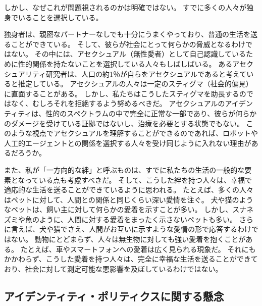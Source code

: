 \documentclass[paper=a4,book,openany]{jlreq}
\begin{document}
しかし、なぜこれが問題視されるのかは明確ではない。
すでに多くの人々が独身でいることを選択している\citep{depaulo17:_how_many_americ_want_be_singl}。

独身者は、親密なパートナーなしでも十分にうまくやっており、普通の生活を送ることができている。
そして、彼らが社会にとって何らかの脅威となるわけではない。
その中には、アセクシュアル（無性愛者）として自己認識しているために性的関係を持たないことを選択している人々もしばしばいる。
あるアセクシュアリティ研究者は、人口の約1％が自らをアセクシュアルであると考えていると推定している\citep{bogaert04:_asexual}。
アセクシュアルの人々は一定のスティグマ（社会的偏見）に直面することがある。
しかし、私たちはこうしたスティグマを助長するのではなく、むしろそれを拒絶するよう努めるべきだ。
アセクシュアルのアイデンティティは、性的のスペクトラムの中で完全に正常な一部であり、彼らが何らかのダメージを受けている証拠ではないし、治療を必要とする状態でもない。
このような視点でアセクシュアルを理解することができるのであれば、ロボットや人工的エージェントとの関係を選択する人々を受け同じように入れない理由があるだろうか。

また、私が「一方向的な絆」と呼ぶものは、すでに私たちの生活の一般的な要素となっている点も考慮すべきだ。
そして、こうした絆を持つ人々は、幸福で適応的な生活を送ることができているように思われる。
たとえば、多くの人々はペットに対して、人間との関係と同じくらい深い愛情を注ぐ。
犬や猫のようなペットは、飼い主に対して何らかの愛着を示すことが多い。
しかし、スナネズミや魚のように、人間に対する愛着をまったく示さないペットも多い。
さらに言えば、犬や猫でさえ、人間がお互いに示すような愛情の形で応答するわけではない。
動物にとどまらず、人々は無生物に対しても強い愛着を抱くことがある。
たとえば、車やスマートフォンへの愛着は広く見られる現象だ。
それにもかかわらず、こうした愛着を持つ人々は、完全に幸福な生活を送ることができており、社会に対して測定可能な悪影響を及ぼしているわけではない。

\subsection{アイデンティティ・ポリティクスに関する懸念}
\end{document}
